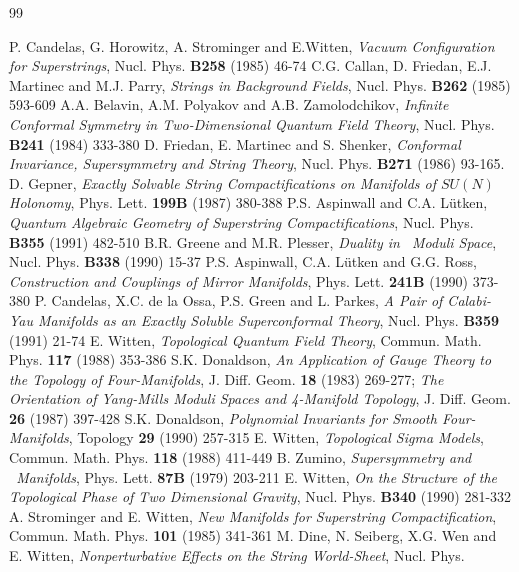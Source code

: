 \begin{thebibliography}{99}

 P. Candelas, G. Horowitz, A. Strominger and E.Witten,
{\em Vacuum Configuration for Superstrings},
Nucl. Phys. {\bf B258} (1985) 46-74
 C.G. Callan, D. Friedan, E.J. Martinec and M.J.
Parry, {\em Strings in Background Fields}, Nucl. Phys. {\bf B262}
(1985) 593-609
 A.A. Belavin, A.M. Polyakov and A.B. Zamolodchikov,
{\em Infinite Conformal Symmetry in Two-Dimensional Quantum Field
Theory}, Nucl. Phys. {\bf B241} (1984) 333-380
 D. Friedan, E. Martinec and S. Shenker, {\em Conformal
Invariance, Supersymmetry and String Theory}, Nucl. Phys. {\bf
B271} (1986) 93-165.
 D. Gepner, {\em Exactly Solvable String
Compactifications on Manifolds of $SU(N)$ Holonomy}, Phys.
Lett. {\bf 199B} (1987) 380-388
 P.S. Aspinwall and C.A. L\"utken,
{\em Quantum Algebraic Geometry of Superstring Compactifications},
Nucl. Phys. {\bf B355} (1991) 482-510
 B.R. Greene and M.R. Plesser, {\em Duality in
\CY\ Moduli Space}, Nucl. Phys. {\bf B338} (1990) 15-37
 P.S. Aspinwall, C.A. L\"utken and G.G. Ross, {\em
Construction and Couplings of Mirror Manifolds}, Phys. Lett.
{\bf 241B} (1990) 373-380
 P. Candelas, X.C. de la Ossa, P.S. Green and L. Parkes,
{\em A Pair of Calabi-Yau Manifolds as an Exactly Soluble Superconformal
Theory}, Nucl. Phys. {\bf B359} (1991) 21-74
 E. Witten, {\em Topological Quantum Field Theory},
Commun. Math. Phys. {\bf 117} (1988) 353-386
 S.K. Donaldson, {\em An Application of Gauge Theory to
the Topology of Four-Manifolds}, J. Diff. Geom. {\bf 18} (1983) 269-277;
{\em The Orientation of Yang-Mills Moduli Spaces and 4-Manifold
Topology}, J. Diff. Geom. {\bf 26} (1987) 397-428
 S.K. Donaldson, {\em Polynomial
Invariants for Smooth Four-Manifolds}, Topology {\bf 29} (1990) 257-315
 E. Witten, {\em Topological Sigma Models}, Commun.
Math. Phys. {\bf 118} (1988) 411-449
 B. Zumino, {\em Supersymmetry and \K\ Manifolds},
Phys. Lett. {\bf 87B} (1979) 203-211
 E. Witten, {\em On the Structure of the
Topological Phase of Two Dimensional Gravity}, Nucl. Phys. {\bf B340}
(1990) 281-332
 A. Strominger and E. Witten, {\em New Manifolds for
Superstring Compactification}, Commun. Math. Phys. {\bf 101}
(1985) 341-361
 M. Dine, N. Seiberg, X.G. Wen and E. Witten, {\em
Nonperturbative Effects on the String World-Sheet}, Nucl. Phys.

\end{thebibliography}
